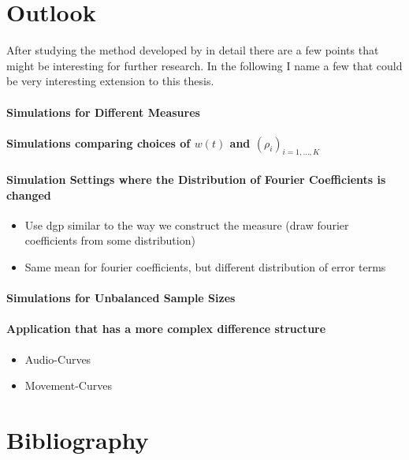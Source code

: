 \documentclass[12pt, a4paper]{article}
\theoremstyle{MAstyle} \newtheorem{assumption}{Assumption}[section]
\theoremstyle{MAstyle} \newtheorem{definition}{Definition}[section]
\theoremstyle{MAstyle} \newtheorem{theorem}{Theorem}[section]
\begin{document}
	\section{Outlook}\label{Outlook}
		After studying the method developed by \cite{bugni_permutation_2021} in detail there are a few points that might be interesting for further research. In the following I name a few that could be very interesting extension to this thesis.
		
		\paragraph{Simulations for Different Measures}
		
		\paragraph{Simulations comparing choices of $w(t)$ and  $\left(\rho_i\right)_{i = 1, \dots, K}$}
		
		\paragraph{Simulation Settings where the Distribution of Fourier Coefficients is changed}
			\begin{itemize}
				\item Use dgp similar to the way we construct the measure (draw fourier coefficients from some distribution)
				\item Same mean for fourier coefficients, but different distribution of error terms
			\end{itemize}
		
		\paragraph{Simulations for Unbalanced Sample Sizes}
		
		\paragraph{Application that has a more complex difference structure}
			\begin{itemize}
				\item Audio-Curves
				\item Movement-Curves
			\end{itemize}
		
		
	
	\newpage
	\section{Bibliography}
	\printbibliography[heading=none]
	
\end{document}
